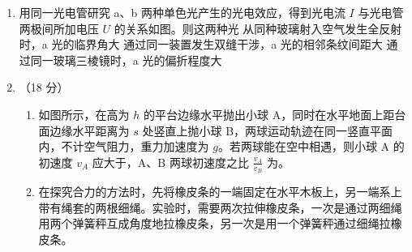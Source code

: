 \documentclass[\gkver]{gaokaozhenti}
\begin{document}
\begin{enumerate}
\item
用同一光电管研究 a、b 两种单色光产生的光电效应，得到光电流 $I$ 与光电管两极间所加电压 $U$ 的关系如图。则这两种光
{从同种玻璃射入空气发生全反射时，a 光的临界角大}
{通过同一装置发生双缝干涉，a 光的相邻条纹间距大}
{通过同一玻璃三棱镜时，a 光的偏折程度大}

\item
（18 分）

\begin{enumerate}
	\item
	如图所示，在高为 $h$ 的平台边缘水平抛出小球 A，同时在水平地面上距台面边缘水平距离为 $s$ 处竖直上抛小球 B，两球运动轨迹在同一竖直平面内，不计空气阻力，重力加速度为 $g$。若两球能在空中相遇，则小球 A 的初速度 $v_{A}$ 应大于，A、B 两球初速度之比 $\frac{v_{A}}{v_{B}}$ 为。


	\item
	在探究合力的方法时，先将橡皮条的一端固定在水平木板上，另一端系上带有绳套的两根细绳。实验时，需要两次拉伸橡皮条，一次是通过两细绳用两个弹簧秤互成角度地拉橡皮条，另一次是用一个弹簧秤通过细绳拉橡皮条。

\end{enumerate}
\end{enumerate}
\end{document}
